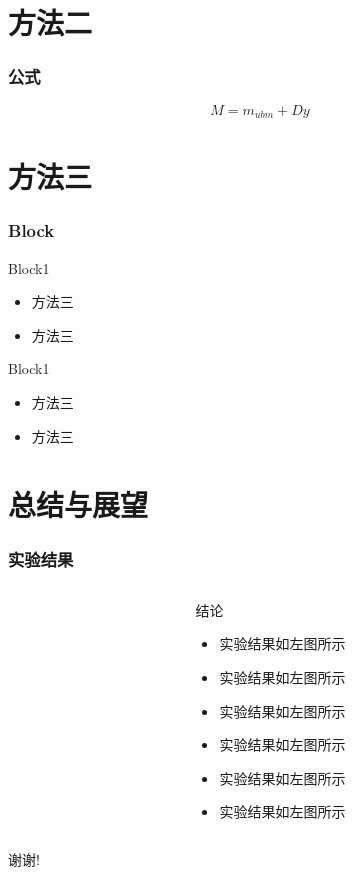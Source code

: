 ﻿\documentclass[12pt]{beamer}	%
\begin{document}

\section{方法二}

\begin{frame}
\frametitle{公式}
$$M=m_{ubm}+Dy$$
\end{frame}


\section{方法三}

\begin{frame}
\frametitle{Block}
\begin{block}{Block1}
	\begin{itemize}
		\item 方法三
        \item 方法三
	\end{itemize}
\end{block}
\pause
\begin{block}{Block1}
	\begin{itemize}
		\item 方法三
        \item 方法三
	\end{itemize}
\end{block}
\end{frame}


\section{总结与展望}

\begin{frame}
\frametitle{实验结果}
\begin{columns}
\begin{column}{0.50\textwidth}
\end{column}
\begin{column}{0.50\textwidth}
\begin{block}{结论}
\begin{itemize}
\item 实验结果如左图所示
\item 实验结果如左图所示
\item 实验结果如左图所示
\item 实验结果如左图所示
\item 实验结果如左图所示
\item 实验结果如左图所示
\end{itemize}
\end{block}
\end{column}
\end{columns}
\end{frame}




\begin{frame}
\centerline{\Large 谢谢!}
\end{frame}
\end{document}
